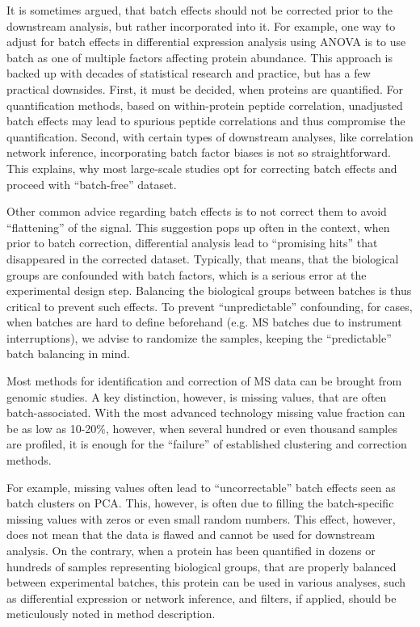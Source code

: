 \documentclass[num-refs]{wiley-article}
\begin{document}
It is sometimes argued, that batch effects should not be corrected prior to the downstream analysis, but rather incorporated into it. For example, one way to adjust for batch effects in differential expression analysis using ANOVA is to use batch as one of multiple factors affecting protein abundance. This approach is backed up with decades of statistical research and practice, but has a few practical downsides. First, it must be decided, when proteins are quantified. For quantification methods, based on within-protein peptide correlation, unadjusted batch effects may lead to spurious peptide correlations and thus compromise the quantification. Second, with certain types of downstream analyses, like correlation network inference, incorporating batch factor biases is not so straightforward. This explains, why most large-scale studies opt for correcting batch effects and proceed with “batch-free” dataset.

Other common advice regarding batch effects is to not correct them to avoid “flattening” of the signal. This suggestion pops up often in the context, when prior to batch correction, differential analysis lead to “promising hits” that disappeared in the corrected dataset. Typically, that means, that the biological groups are confounded with batch factors, which is a serious error at the experimental design step. Balancing the biological groups between batches is thus critical to prevent such effects. To prevent “unpredictable” confounding, for cases, when batches are hard to define beforehand (e.g. MS batches due to instrument interruptions), we advise to randomize the samples, keeping the “predictable” batch balancing in mind.

Most methods for identification and correction of MS data can be brought from genomic studies. A key distinction, however, is missing values, that are often batch-associated. With the most advanced technology missing value fraction can be as low as 10-20\%, however, when several hundred or even thousand samples are profiled, it is enough for the “failure” of established clustering and correction methods. 

For example, missing values often lead to “uncorrectable” batch effects seen as batch clusters on PCA. This, however, is often due to filling the batch-specific missing values with zeros or even small random numbers. This effect, however, does not mean that the data is flawed and cannot be used for downstream analysis. On the contrary, when a protein has been quantified in dozens or hundreds of samples representing biological groups, that are properly balanced between experimental batches, this protein can be used in various analyses, such as differential expression or network inference, and filters, if applied, should be meticulously noted in method description.
\end{document}
